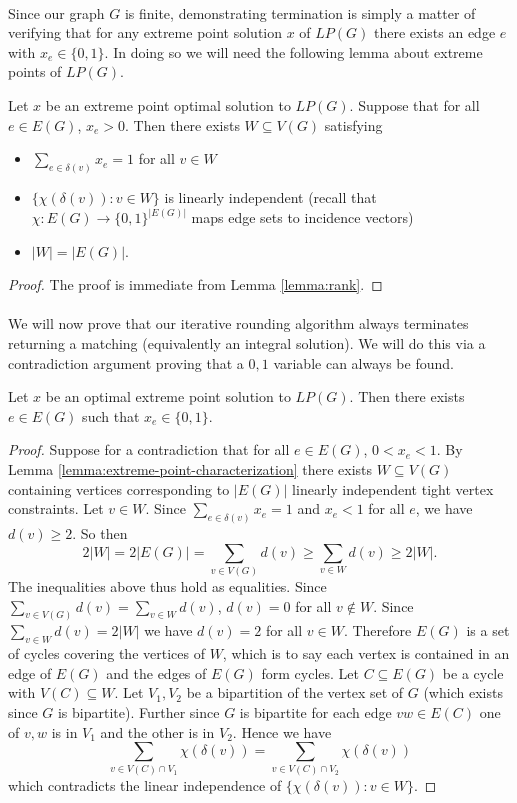 \paragraph{} Since our graph $G$ is finite, demonstrating termination is simply a matter of verifying that for any extreme point solution $x$ of $LP(G)$ there exists an edge $e$ with $x_e \in \{0,1\}$. In doing so we will need the following lemma about extreme points of $LP(G)$.
\begin{lemma}\label{lemma:extreme-point-characterization} Let $x$ be an extreme point optimal solution to $LP(G)$. Suppose that for all $e \in E(G)$, $x_e > 0$. Then there exists $W \subseteq V(G)$ satisfying
\begin{itemize}
\item $\sum_{e\in\delta(v)} x_e = 1$ for all $v \in W$ \\
\item $\{\chi(\delta(v)) : v \in W\}$ is linearly independent (recall that $\chi : E(G)\rightarrow \{0,1\}^{|E(G)|}$ maps edge sets to incidence vectors)
\item $|W| = |E(G)|$.
\end{itemize} 
\end{lemma}
\begin{proof}
The proof is immediate from Lemma \ref{lemma:rank}.
\end{proof}
\paragraph{} We will now prove that our iterative rounding algorithm always terminates returning a matching (equivalently an integral solution). We will do this via a contradiction argument proving that a $0,1$ variable can always be found.
\begin{lemma} Let $x$ be an optimal extreme point solution to $LP(G)$. Then there exists $e \in E(G)$ such that $x_e \in \{0,1\}$.
\end{lemma}
\begin{proof}
Suppose for a contradiction that for all $e\in E(G)$, $0 < x_e < 1$. By Lemma \ref{lemma:extreme-point-characterization} there exists $W \subseteq V(G)$ containing vertices corresponding to $|E(G)|$ linearly independent tight vertex constraints. Let $v \in W$. Since $\sum_{e\in \delta(v)} x_e = 1$ and $x_e < 1$ for all $e$, we have $d(v) \geq 2$. So then
$$2|W| = 2|E(G)| = \sum_{v \in V(G)} d(v) \geq \sum_{v\in W} d(v) \geq 2|W|.$$
The inequalities above thus hold as equalities. Since $\sum_{v\in V(G)} d(v) = \sum_{v \in W} d(v)$, $d(v) = 0$ for all $v \not\in W$. Since $\sum_{v \in W} d(v) = 2|W|$ we have $d(v) = 2$ for all $v \in W$. Therefore $E(G)$ is a set of cycles covering the vertices of $W$, which is to say each vertex is contained in an edge of $E(G)$ and the edges of $E(G)$ form cycles. Let $C \subseteq E(G)$ be a cycle with $V(C) \subseteq W$. Let $V_1, V_2$ be a bipartition of the vertex set of $G$ (which exists since $G$ is bipartite). Further since $G$ is bipartite for each edge $vw \in E(C)$ one of $v,w $ is in $V_1$ and the other is in $V_2$. Hence we have
$$\sum_{v \in V(C) \cap V_1} \chi(\delta(v)) = \sum_{v\in V(C) \cap V_2} \chi(\delta(v))$$
which contradicts the linear independence of $\{\chi(\delta(v)) : v \in W\}$.
\end{proof}
